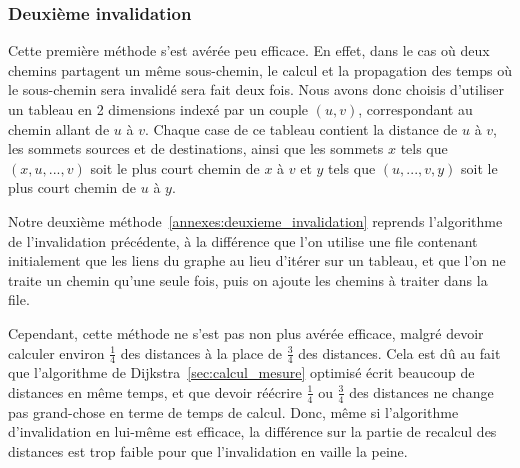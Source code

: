 \subsubsection*{Deuxième invalidation}

Cette première méthode s'est avérée peu efficace. En effet, dans le cas où deux chemins partagent un même sous-chemin, le calcul et la propagation des temps où le sous-chemin sera invalidé sera fait deux fois. Nous avons donc choisis d'utiliser un tableau en 2 dimensions indexé par un couple $(u,v)$, correspondant au chemin allant de $u$ à $v$. Chaque case de ce tableau contient la distance de $u$ à $v$, les sommets sources et de destinations, ainsi que les sommets $x$ tels que $(x, u, ..., v)$ soit le plus court chemin de $x$ à $v$ et $y$ tels que $(u, ..., v, y)$ soit le plus court chemin de $u$ à $y$.

Notre deuxième méthode~\ref{annexes:deuxieme_invalidation} reprends l'algorithme de l'invalidation précédente, à la différence que l'on utilise une file contenant initialement que les liens du graphe au lieu d'itérer sur un tableau, et que l'on ne traite un chemin qu'une seule fois, puis on ajoute les chemins à traiter dans la file.

Cependant, cette méthode ne s'est pas non plus avérée efficace, malgré devoir calculer environ ${\frac{1}{4}}$ des distances à la place de ${\frac{3}{4}}$ des distances.
Cela est dû au fait que l'algorithme de Dijkstra~\ref{sec:calcul_mesure} optimisé écrit beaucoup de distances en même temps, et que devoir réécrire ${\frac{1}{4}}$ ou ${\frac{3}{4}}$ des distances ne change pas grand-chose en terme de temps de calcul.
Donc, même si l'algorithme d'invalidation en lui-même est efficace, la différence sur la partie de recalcul des distances est trop faible pour que l'invalidation en vaille la peine.